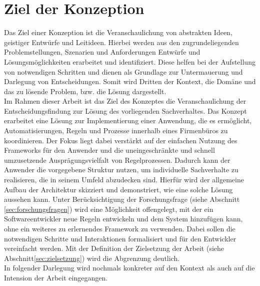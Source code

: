 \section{Ziel der Konzeption}
\label{sec:konzeptziele}
    Das Ziel einer Konzeption ist die Veranschaulichung von abstrakten Ideen, geistiger Entwürfe und Leitideen. 
    Hierbei werden aus den zugrundeliegenden Problemstellungen, Szenarien und Anforderungen Entwürfe und 
    Lösungsmöglichkeiten erarbeitet und identifiziert. Diese helfen bei der Aufstellung von notwendigen Schritten 
    und dienen als Grundlage zur Untermauerung und Darlegung von Entscheidungen. Somit wird Dritten der Kontext, die 
    Domäne und das zu lösende Problem, bzw. die Lösung dargestellt. 
    \\
    \linebreak
    Im Rahmen dieser Arbeit ist das Ziel des Konzeptes die Veranschaulichung der Entscheidungsfindung zur Lösung des vorliegenden 
    Sachverhaltes. Das Konzept 
    erarbeitet eine Lösung zur Implementierung einer Anwendung, die es ermöglicht, Automatisierungen, Regeln und Prozesse innerhalb eines 
    Firmenbüros zu koordinieren. Der Fokus liegt dabei verstärkt auf der einfachen Nutzung des Frameworks für den Anwender und 
    die uneingeschränkte und schnell umzusetzende Ausprägungsvielfalt von Regelprozessen. Dadurch kann der Anwender die vorgegebene Struktur nutzen, um individuelle 
    Sachverhalte zu realisieren, die in seinem Umfeld abzudecken sind. 
    Hierfür wird der allgemeine Aufbau der Architektur skizziert und demonstriert, wie eine solche Lösung aussehen kann. 
    Unter Berücksichtigung der Forschungsfrage (siehe Abschnitt \ref{sec:forschungsfragen}) wird eine Möglichkeit offengelegt, mit der 
    ein Softwareentwickler neue Regeln entwickeln und dem System hinzufügen kann, ohne ein weiteres zu erlernendes Framework zu verwenden. 
    Dabei sollen die notwendigen Schritte und Interaktionen formalisiert und für den Entwickler vereinfacht werden. Mit der 
    Definition der Zielsetzung der Arbeit (siehe Abschnitt\ref{sec:zielsetzung}) wird die Abgrenzung deutlich. 
    \\
    \linebreak
    In folgender Darlegung %
    wird nochmals konkreter auf den Kontext als auch auf die Intension der Arbeit eingegangen. 

